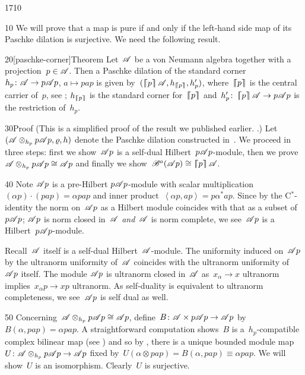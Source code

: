 \begin{parsec}{1710}%
\begin{point}{10}%
We will prove that a map is pure if and only if
    the left-hand side map of its Paschke dilation
    is surjective.  We need the following result.
\end{point}
\begin{point}{20}[paschke-corner]{Theorem}%
Let~$\mathscr{A}$ be a von Neumann algebra together with a projection~$p \in \mathscr{A}$.
Then a Paschke dilation of the standard corner~$h_p \colon \mathscr{A} \to p\mathscr{A} p$,
$a \mapsto pap$
is given by~$(\cceil{p}\scrA, h_{\cceil{p}}, h'_p)$,
    where~$\left\lceil\!\!\left\lceil p\right\rceil\!\!\right\rceil$ is the central  carrier of~$p$,
    see ;
    $h_{\left\lceil\!\!\left\lceil p\right\rceil\!\!\right\rceil}$ is the standard corner for~$\left\lceil\!\!\left\lceil p\right\rceil\!\!\right\rceil$
        and~$h'_p \colon \left\lceil\!\!\left\lceil p\right\rceil\!\!\right\rceil \mathscr{A} \to p\mathscr{A} p$
        is the restriction of~$h_p$.
\begin{point}{30}{Proof}%
(This is a simplified proof of the result we published earlier.
    \cite[Thm.~28]{wwpaschke}.)
Let~$(\mathscr{A} \otimes_{h_p} p\mathscr{A} p, \varrho, h)$
    denote the Paschke dilation constructed in~.
We proceed in three steps:
    first we show~$\mathscr{A} p$ is a self-dual Hilbert~$p\mathscr{A} p$-module,
    then we prove~$\mathscr{A} \otimes_{h_p} p\mathscr{A} p \cong \mathscr{A} p$
    and finally we show~$\mathscr{B}^a(\mathscr{A} p) \cong \left\lceil\!\!\left\lceil p\right\rceil\!\!\right\rceil \mathscr{A}$.
\begin{point}{40}%
Note $\mathscr{A} p$ is a pre-Hilbert $p \mathscr{A} p$-module
    with scalar multiplication~$(\alpha p)\cdot (pap) = \alpha pap$
    and inner product~$\left<\alpha p, ap\right> = p\alpha^*ap$.
Since by the C$^*$-identity the norm on~$\mathscr{A} p$
    as a Hilbert module coincides with that as a subset of~$p \mathscr{A} p$;
    $\mathscr{A} p$ is norm closed in~$\mathscr{A}$ \emph{and}~$\mathscr{A}$ is norm complete,
    we see~$\mathscr{A} p$ is a Hilbert~$p \mathscr{A} p$-module.

Recall~$\mathscr{A}$ itself is a self-dual Hilbert~$\mathscr{A}$-module.
The uniformity induced on~$\mathscr{A} p$ by the ultranorm uniformity
    of~$\mathscr{A}$ coincides with the ultranorm uniformity of~$\mathscr{A} p$ itself.
The module $\mathscr{A} p$ is ultranorm closed in~$\mathscr{A}$
    as~$x_\alpha \to x$ ultranorm
    implies~$x_\alpha p \to xp$ ultranorm.
As self-duality is equivalent to ultranorm completeness,
    we see~$\mathscr{A} p$ is self dual as well.
\end{point}
\begin{point}{50}%
Concerning~$\mathscr{A} \otimes_{h_p} p \mathscr{A} p \cong \mathscr{A} p$,
    define~$B\colon \mathscr{A} \times  p \mathscr{A} p \to \mathscr{A} p$
    by~$B(\alpha, pap) = \alpha pap$.
A straightforward computation
    shows~$B$ is a~$h_p$-compatible complex bilinear map
    (see )
    and so by ,  there is a unique bounded module
    map~$U \colon \mathscr{A} \otimes_{h_p} p \mathscr{A} p \to \mathscr{A} p$
    fixed by~$U (\alpha \otimes pap) = B(\alpha,pap) \equiv \alpha pap $.
We will show~$U$ is an isomorphism.
   Clearly~$U$ is surjective.


\end{point}
\end{point}
\end{point}
\end{parsec}
